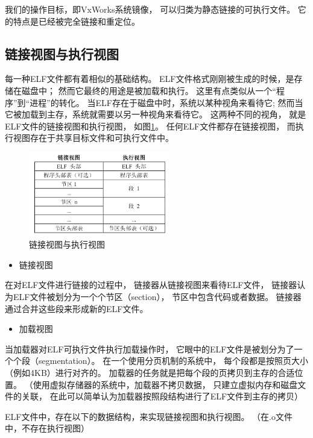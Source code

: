 我们的操作目标，即VxWorks系统镜像，
可以归类为静态链接的可执行文件。
它的特点是已经被完全链接和重定位。

\subsection{链接视图与执行视图}

每一种ELF文件都有着相似的基础结构。
ELF文件格式刚刚被生成的时候，是存储在磁盘中；
然而它最终的用途是被加载和执行。
这里有点类似从一个“程序”到“进程”的转化。
当ELF存在于磁盘中时，系统以某种视角来看待它;
然而当它被加载到主存，系统就需要以另一种视角来看待它。
这两种不同的视角，
就是ELF文件的链接视图和执行视图，
如图\ref{elf-map}。
任何ELF文件都存在链接视图，
而执行视图存在于共享目标文件和可执行文件中。

\begin{figure}[h!]
  \centering
  \includegraphics[width=0.55\textwidth]{figure/elf-map.png}
  \caption{链接视图与执行视图}
  \label{elf-map}
\end{figure}

\begin{itemize}
  \item 链接视图
\end{itemize}

在对ELF文件进行链接的过程中，
链接器从链接视图来看待ELF文件，
链接器认为ELF文件被划分为一个个节区（section），
节区中包含代码或者数据。
链接器通过合并这些段来形成新的ELF文件。

\begin{itemize}
  \item 加载视图
\end{itemize}


当加载器对ELF可执行文件执行加载操作时，
它眼中的ELF文件是被划分为了一个个段（segmentation）。
在一个使用分页机制的系统中，
每个段都是按照页大小（例如4KB）进行对齐的。
加载器的任务就是把每个段的页拷贝到主存的合适位置。
（使用虚拟存储器的系统中，加载器不拷贝数据，
只建立虚拟内存和磁盘文件的关联，
在此可以简单认为加载器按照段结构进行了ELF文件到主存的拷贝）

ELF文件中，存在以下的数据结构，来实现链接视图和执行视图。
（在.o文件中，不存在执行视图）

